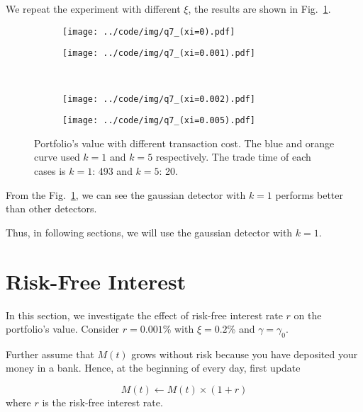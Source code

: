 \documentclass[runningheads]{llncs}
\begin{document}
We repeat the experiment with different $\xi$, the results are shown in Fig.~\ref{fig:q7}.

\begin{figure}[!htbp]
    \begin{subfigure}[t]{0.49\textwidth}
        \centering
        \texttt{[image: ../code/img/q7\_(xi=0).pdf]}
    \end{subfigure}
    \begin{subfigure}[t]{0.49\textwidth}
        \centering
        \texttt{[image: ../code/img/q7\_(xi=0.001).pdf]}
    \end{subfigure}
    ~
    \begin{subfigure}[t]{0.49\textwidth}
        \centering
        \texttt{[image: ../code/img/q7\_(xi=0.002).pdf]}
    \end{subfigure}
    \begin{subfigure}[t]{0.49\textwidth}
        \centering
        \texttt{[image: ../code/img/q7\_(xi=0.005).pdf]}
    \end{subfigure}
    \caption{Portfolio's value with different transaction cost. The blue and orange curve used $k=1$ and $k=5$ respectively. The trade time of each cases is $k=1$: 493 and $k=5$: 20.}
    \label{fig:q7}
\end{figure}

From the Fig.~\ref{fig:q7},  we can see the gaussian detector with $k=1$ performs better than other detectors.

Thus, in following sections, we will use the gaussian detector with $k=1$.

\section{Risk-Free Interest}\label{sec:8}

In this section, we investigate the effect of risk-free interest rate $r$ on the portfolio's value. Consider $r = 0.001$\% with $\xi = 0.2$\% and $\gamma = \gamma_0$.

Further assume that $M(t)$ grows without risk because you have deposited your money in a bank. Hence, at the beginning of every day, first update

\begin{equation}
    M(t) \leftarrow M(t) \times (1+r)
\end{equation}
where $r$ is the risk-free interest rate.
\end{document}
